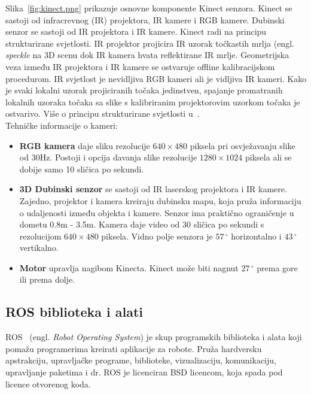 Slika~\ref{fig:kinect.png} prikazuje osnovne komponente Kinect senzora.
Kinect se sastoji od infracrevnog (IR) projektora, IR kamere i RGB
kamere. Dubinski senzor se sastoji od IR projektora i IR kamere. Kinect
radi na principu strukturirane svjetlosti. IR projektor projicira IR
uzorak točkastih mrlja (engl. \textit{speckle} na 3D scenu dok IR kamera
hvata reflektirane IR mrlje. Geometrijska veza između IR projektora i IR
kamere se ostvaruje offline kalibracijskom procedurom. IR svjetlost je
nevidljiva RGB kameri ali je vidljiva IR kameri. Kako je svaki lokalni
uzorak projiciranih točaka jedinstven, spajanje promatranih lokalnih
uzoraka točaka sa slike s kalibriranim projektorovim uzorkom točaka je
ostvarivo. Više o principu strukturirane svjetlosti
u~\cite{structured:light}.\\

\newpage
Tehničke informacije o kameri:
\begin{itemize}
    \item \textbf{RGB kamera} daje sliku rezolucije \(640\times480\)
        piksela pri osvježavanju slike od 30Hz. Postoji i opcija davanja
        slike rezolucije \(1280 \times 1024\) piksela ali se dobije samo 10
        sličica po sekundi.
    \item \textbf{3D Dubinski senzor} se sastoji od IR laserskog
        projektora i IR kamere. Zajedno, projektor i kamera kreiraju
        dubinsku mapu, koja pruža informaciju o udaljenosti između
        objekta i kamere. Senzor ima praktično ograničenje u dometu 
        0.8m - 3.5m. Kamera daje video od 30 sličica po sekundi s
        rezolucijom \(640 \times 480\) piksela. Vidno polje senzora je
        \(57\,^{\circ}\) horizontalno i \(43\,^{\circ}\) vertikalno.
    \item \textbf{Motor} upravlja nagibom Kinecta. Kinect može biti
        nagnut \(27\,^{\circ}\) prema gore ili prema dolje.
\end{itemize}



\newpage
\subsection{ROS biblioteka i alati} %
\label{sub:ROS biblioteka i alati}

ROS~\cite{ros} (engl. \textit{Robot Operating System}) je skup
programskih biblioteka i alata koji pomažu programerima kreirati
aplikacije za robote. Pruža hardversku apstrakciju, upravljačke
programe, biblioteke, vizualizaciju, komunikaciju, upravljanje paketima
i dr. ROS je licenciran BSD licencom, koja spada pod licence otvorenog
koda.

